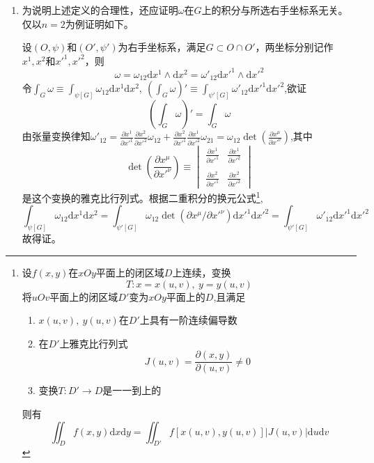 \begin{note}
    \begin{enumerate}[（1）]
        \item 为说明上述定义的合理性，还应证明$\omega$在$G$上的积分与所选右手坐标系无关。
        仅以$n = 2$为例证明如下。
        
        设$(O, \psi)$和$(O', \psi')$为右手坐标系，满足$G \subset O \cap O'$，两坐标分别记作$x^1, x^2$和$x'^1, x'^2$，则
        $$\omega = \omega_{12}\mathrm{d}x^1 \wedge \mathrm{d}x^2 = \omega'_{12}\mathrm{d}x'^1 \wedge \mathrm{d}x'^2$$
        令$\displaystyle\int_G\omega \equiv \int_{\psi[G]}\omega_{12}\mathrm{d}x^1\mathrm{d}x^2, ~ (\int_G\omega)' \equiv \int_{\psi'[G]}\omega'_{12}\mathrm{d}x'^1\mathrm{d}x'^2$,欲证
        $$(\int_G\omega)' = \int_G\omega$$
        由张量变换律知$\omega'_{12} = \displaystyle\frac{\partial x^1}{\partial x'^1}\frac{\partial x^2}{\partial x'^2}\omega_{12} + \frac{\partial x^2}{\partial x'^1} \frac{\partial x^1}{\partial x'^2}\omega_{21} = \omega_{12}\det(\frac{\partial x^\mu}{\partial x'^\nu})$,其中
        $$\det(\frac{\partial x^\mu}{\partial x'^\nu}) \equiv \begin{vmatrix}
            \displaystyle\frac{\partial x^1}{\partial x'^1} & \displaystyle\frac{\partial x^1}{\partial x'^2} \\
            \\
            \displaystyle\frac{\partial x^2}{\partial x'^1} & \displaystyle\frac{\partial x^2}{\partial x'^2}
        \end{vmatrix}$$
        是这个变换的雅克比行列式。根据二重积分的换元公式\footnote{
            设$f(x, y)$在$xOy$平面上的闭区域$D$上连续，变换
            $$T \colon x = x(u, v), ~ y = y(u, v)$$
            将$uOv$平面上的闭区域$D'$变为$xOy$平面上的$D$,且满足
            \begin{enumerate}[（1）]
                \item $x(u, v), ~ y(u, v)$在$D'$上具有一阶连续偏导数
                \item 在$D'$上雅克比行列式
                $$J(u, v) = \frac{\partial(x, y)}{\partial(u, v)} \neq 0$$
                \item 变换$T \colon D' \to D$是一一到上的
            \end{enumerate}
            则有
            $$\iint_Df(x, y)\mathrm{d}x\mathrm{d}y = \iint_{D'}f[x(u, v), y(u, v)]|J(u,v)|\mathrm{d}u\mathrm{d}v$$
        },
        $$\int_{\psi[G]}\omega_{12}\mathrm{d}x^1\mathrm{d}x^2 = \int_{\psi'[G]}\omega_{12}\det(\partial x^\mu / \partial x'^\nu)\mathrm{d}x'^1\mathrm{d}x'^2 = \int_{\psi'[G]}\omega'_{12}\mathrm{d}x'^1\mathrm{d}x'^2$$
        故得证。


\end{enumerate}
\end{note}
